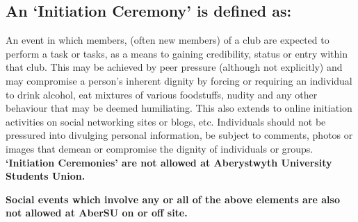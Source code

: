 \documentclass[a4paper,11pt]{article}
\begin{document}
\subsection{An `Initiation Ceremony' is defined as:}
An event in which members, (often new members) of a club are expected to perform a task or tasks, as a means to gaining credibility, status or entry within that club. This may be achieved by peer pressure (although not explicitly) and may compromise a person’s inherent dignity by forcing or requiring an individual to drink alcohol, eat mixtures of various foodstuffs, nudity and any other behaviour that may be deemed humiliating. This also extends to online initiation activities on social networking sites or blogs, etc. Individuals should not be pressured into divulging personal information, be subject to comments, photos or images that demean or compromise the dignity of individuals or groups.\newline
\textbf{‘Initiation Ceremonies’ are not allowed at Aberystwyth University Students Union.}
\begin{center}
\textbf{Social events which involve any or all of the above elements are also not allowed at AberSU on or off site.}
\end{center}

\newpage
\end{document}
